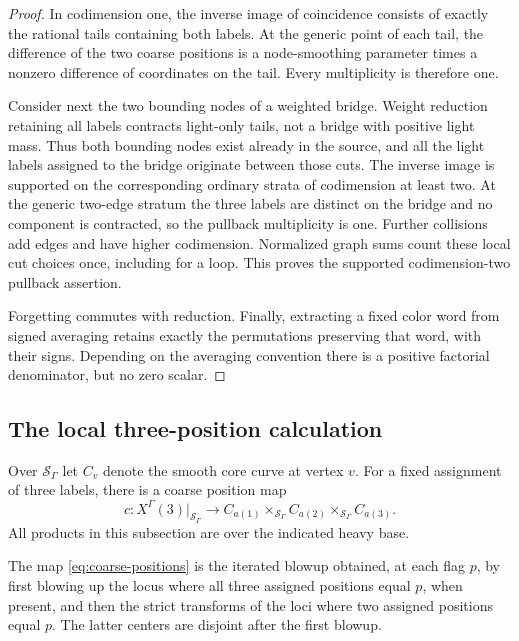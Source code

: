 \begin{proof}
In codimension one, the inverse image of coincidence consists of
exactly the rational tails containing both labels.  At the generic
point of each tail, the difference of the two coarse positions is a
node-smoothing parameter times a nonzero difference of coordinates on
the tail.  Every multiplicity is therefore one.

Consider next the two bounding nodes of a weighted bridge.  Weight
reduction retaining all labels contracts light-only tails, not a bridge
with positive light mass.  Thus both bounding nodes exist already in
the source, and all the light labels assigned to the bridge originate
between those cuts.  The inverse image is supported on the
corresponding ordinary strata of codimension at least two.  At the
generic two-edge stratum the three labels are distinct on the bridge
and no component is contracted, so the pullback multiplicity is one.
Further collisions add edges and have higher codimension.  Normalized
graph sums count these local cut choices once, including for a loop.
This proves the supported codimension-two pullback assertion.

Forgetting commutes with reduction.  Finally, extracting a fixed color
word from signed averaging retains exactly the permutations preserving
that word, with their signs.  Depending on the averaging convention
there is a positive factorial denominator, but no zero scalar.
\end{proof}

\subsection{The local three-position calculation}

Over $\mathcal S_\Gamma$ let $C_v$ denote the smooth core curve at
vertex $v$.  For a fixed assignment of three labels, there is a coarse
position map
\begin{equation}\label{eq:coarse-positions}
 c:X^\Gamma(3)|_{\mathcal S_\Gamma}
       \longrightarrow
       C_{a(1)}\times_{\mathcal S_\Gamma}
       C_{a(2)}\times_{\mathcal S_\Gamma} C_{a(3)}.
\end{equation}
All products in this subsection are over the indicated heavy base.

\begin{lemma}\label{lem:three-position-blowup}
The map \eqref{eq:coarse-positions} is the iterated blowup obtained,
at each flag $p$, by first blowing up the locus where all three
assigned positions equal $p$, when present, and then the strict
transforms of the loci where two assigned positions equal $p$.
The latter centers are disjoint after the first blowup.
\end{lemma}


